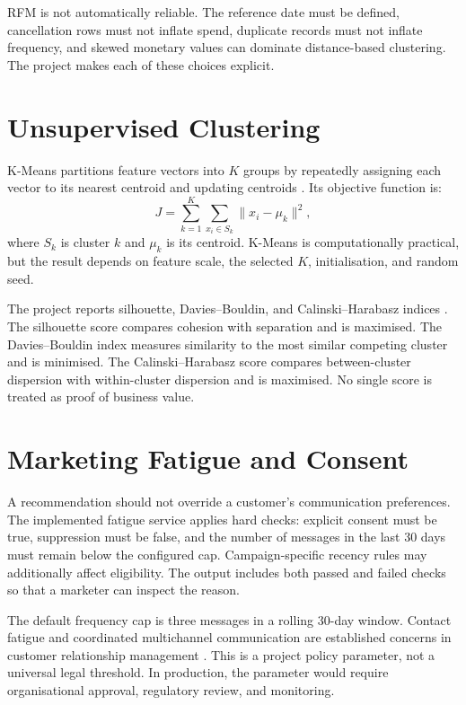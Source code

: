 \documentclass[12pt,a4paper]{report}
\begin{document}
RFM is not automatically reliable. The reference date must be defined, cancellation rows must not inflate spend, duplicate records must not inflate frequency, and skewed monetary values can dominate distance-based clustering. The project makes each of these choices explicit.

\section{Unsupervised Clustering}
K-Means partitions feature vectors into $K$ groups by repeatedly assigning each vector to its nearest centroid and updating centroids \cite{macqueen1967}. Its objective function is:
\begin{equation}
J = \sum_{k=1}^{K}\sum_{x_i\in S_k}\lVert x_i-\mu_k\rVert^2,
\end{equation}
where $S_k$ is cluster $k$ and $\mu_k$ is its centroid. K-Means is computationally practical, but the result depends on feature scale, the selected $K$, initialisation, and random seed.

The project reports silhouette, Davies--Bouldin, and Calinski--Harabasz indices \cite{rousseeuw1987,davies1979,calinski1974}. The silhouette score compares cohesion with separation and is maximised. The Davies--Bouldin index measures similarity to the most similar competing cluster and is minimised. The Calinski--Harabasz score compares between-cluster dispersion with within-cluster dispersion and is maximised. No single score is treated as proof of business value.

\section{Marketing Fatigue and Consent}
A recommendation should not override a customer's communication preferences. The implemented fatigue service applies hard checks: explicit consent must be true, suppression must be false, and the number of messages in the last 30 days must remain below the configured cap. Campaign-specific recency rules may additionally affect eligibility. The output includes both passed and failed checks so that a marketer can inspect the reason.

The default frequency cap is three messages in a rolling 30-day window. Contact fatigue and coordinated multichannel communication are established concerns in customer relationship management \cite{godfrey2011,kumar2016,verhoef2015}. This is a project policy parameter, not a universal legal threshold. In production, the parameter would require organisational approval, regulatory review, and monitoring.
\end{document}

